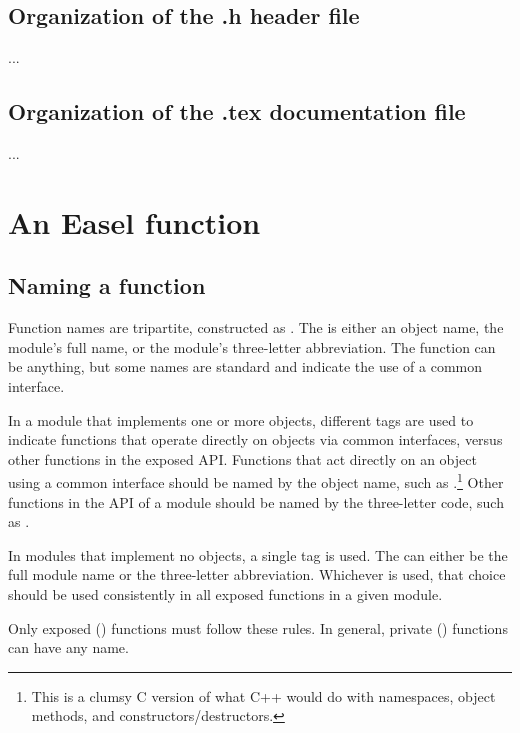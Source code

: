    \subsection{Organization of the .h header file}

...

   \subsection{Organization of the .tex documentation file}
...



\section{An Easel function}

\subsection{Naming a function}

Function names are tripartite, constructed as
.  The  is either an
object name, the module's full name, or the module's three-letter
abbreviation. The function  can be anything, but some
names are standard and indicate the use of a common interface.

In a module that implements one or more objects, different tags are
used to indicate functions that operate directly on objects via common
interfaces, versus other functions in the exposed API.  Functions that
act directly on an object using a common interface should be named by
the object name, such as
.\footnote{This is a clumsy C version
of what C++ would do with namespaces, object methods, and
constructors/destructors.} Other functions in the API of a module
should be named by the three-letter code, such as
.

In modules that implement no objects, a single tag is used. The
 can either be the full module name or the three-letter
abbreviation. Whichever is used, that choice should be used
consistently in all exposed functions in a given module.

Only exposed () functions must follow these rules. In
general, private () functions can have any name.

